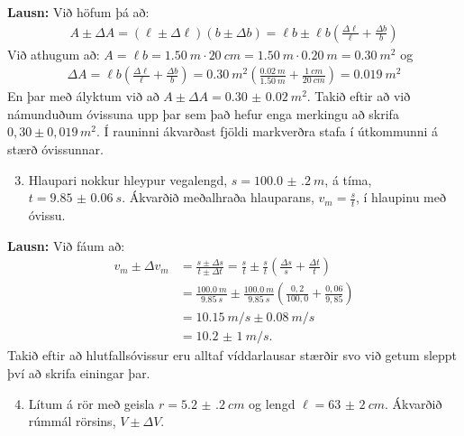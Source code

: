 \textbf{Lausn:} Við höfum þá að:
\begin{align*}
    A \pm \Delta A = (\ell \pm \Delta \ell)(b \pm \Delta b) = \ell b \pm \ell b \left( \frac{\Delta \ell}{\ell} + \frac{\Delta b}{b} \right)
\end{align*}
Við athugum að: $A = \ell b = \SI{1,50}{m} \cdot \SI{20}{cm} = \SI{1,50}{m} \cdot \SI{0.20}{m} = \SI{0.30}{m^2}$ og
\begin{align*}
    \Delta A = \ell b \left( \frac{\Delta \ell}{\ell} + \frac{\Delta b}{b} \right) = \SI{0.30}{m^2} \left( \frac{\SI{0.02}{m}}{\SI{1.50}{m}} + \frac{\SI{1}{cm}}{\SI{20}{cm}} \right) = \SI{0.019}{m^2}
\end{align*}
En þar með ályktum við að $A \pm \Delta A = \SI{0.30(2)}{m^2}$. Takið eftir að við námunduðum óvissuna upp þar sem það hefur enga merkingu að skrifa $0,30 \pm 0,019 \, \si{m^2}$. Í rauninni ákvarðast fjöldi markverðra stafa í útkommunni á stærð óvissunnar.

\begin{enumerate}[label = \textbf{Sýnidæmi \thechapter.\arabic*.}]

\setcounter{enumi}{2}

\item Hlaupari nokkur hleypur vegalengd, $s = \SI{100.0(2)}{m}$, á tíma, $t = \SI{9.85(6)}{s}$. Ákvarðið meðalhraða hlauparans, $v_m = \frac{s}{t}$, í hlaupinu með óvissu.
\end{enumerate}

\textbf{Lausn:} Við fáum að:
\begin{align*}
    v_m \pm \Delta v_m &= \frac{s \pm \Delta s}{t \pm \Delta t}  = \frac{s}{t} \pm \frac{s}{t}\left( \frac{\Delta s}{s} + \frac{\Delta t}{t} \right) \\
    &= \frac{\SI{100.0}{m}}{\SI{9.85}{s}} \pm \frac{\SI{100.0}{m}}{\SI{9.85}{s}}\left( \frac{0,2}{100,0} + \frac{0,06}{9,85} \right) \\
    &= \SI{10.15}{m/s} \pm \SI{0.08}{m/s} \\
    &= \SI{10,2(1)}{m/s}.
\end{align*}
Takið eftir að hlutfallsóvissur eru alltaf víddarlausar stærðir svo við getum sleppt því að skrifa einingar þar.



\begin{enumerate}[label = \textbf{Sýnidæmi \thechapter.\arabic*.}]

\setcounter{enumi}{3}

\item Lítum á rör með geisla $r = \SI{5.2(2)}{cm}$ og lengd $\ell = \SI{63(2)}{cm}$. Ákvarðið rúmmál rörsins, $V \pm \Delta V$.

\end{enumerate}

